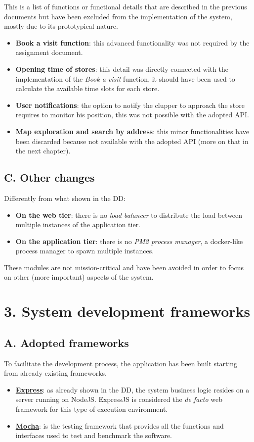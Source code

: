 This is a list of functions or functional details that are described in the previous documents but have been excluded from the implementation of the system, mostly due to its prototypical nature.
\begin{itemize}
  \item \textbf{Book a visit function}: this advanced functionality was not required by the assignment document.
  \item \textbf{Opening time of stores}: this detail was directly connected with the implementation of the \emph{Book a visit} function, it should have been used to calculate the available time slots for each store.
  \item \textbf{User notifications}: the option to notify the clupper to approach the store requires to monitor his position, this was not possible with the adopted API.
  \item \textbf{Map exploration and search by address}: this minor functionalities have been discarded because not available with the adopted API (more on that in the next chapter).
\end{itemize}

\section{C. Other changes}

Differently from what shown in the DD:
\begin{itemize}
  \item \textbf{On the web tier}: there is no \emph{load balancer} to distribute the load between multiple instances of the application tier.
  \item \textbf{On the application tier}: there is no \emph{PM2 process manager}, a docker-like process manager to spawn multiple instances.
\end{itemize}
These modules are not mission-critical and have been avoided in order to focus on other (more important) aspects of the system.

\chapter{3. System development frameworks}

\section{A. Adopted frameworks}

To facilitate the development process, the application has been built starting from already existing frameworks.
\begin{itemize}
  \item \textbf{\href{https://www.npmjs.com/package/express}{Express}}: as already shown in the DD, the system business logic resides on a server running on NodeJS.
  ExpressJS is considered the \emph{de facto} web framework for this type of execution environment.
  \item \textbf{\href{https://www.npmjs.com/package/mocha}{Mocha}}: is the testing framework that provides all the functions and interfaces used to test and benchmark the software.
\end{itemize}

